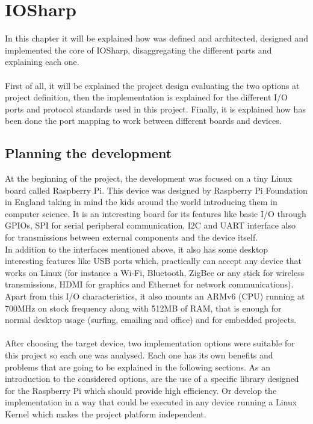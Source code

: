 \chapter{IOSharp}\label{C:IOSharp development}
In this chapter it will be explained how was defined and architected, designed and implemented the core of IOSharp, disaggregating the different parts and explaining each one.
\\
\\
First of all, it will be explained the project design evaluating the two options at project definition, then the implementation is explained for the different I/O ports and protocol standards used in this project. Finally, it is explained how has been done the port mapping to work between different boards and devices.

\section{Planning the development}\label{S:IOSharp-Design}
At the beginning of the project, the development was focused on a tiny Linux board called Raspberry Pi. This device was designed by Raspberry Pi Foundation in England taking in mind the kids around the world introducing them in computer science. It is an interesting board for its features like basic I/O through GPIOs, \gls{SPI} for serial peripheral communication, \gls{I2C} and UART interface also for transmissions between external components and the device itself.
\\
In addition to the interfaces mentioned above, it also has some desktop interesting features like USB ports which, practically can accept any device that works on Linux (for instance a Wi-Fi, Bluetooth, ZigBee or any stick for wireless transmissions, HDMI for graphics and Ethernet for network communications). Apart from this I/O characteristics, it also mounts an ARMv6 (CPU) running at 700MHz on stock frequency along with 512MB of RAM, that is enough for normal desktop usage (surfing, emailing and office) and for embedded projects.
\\
\\
After choosing the target device, two implementation options were suitable for this project so each one was analysed. Each one has its own benefits and problems that are going to be explained in the following sections. As an introduction to the considered options, are the use of a specific library designed for the Raspberry Pi which should provide high efficiency. Or develop the implementation in a way that could be executed in any device running a Linux Kernel which makes the project platform independent.

